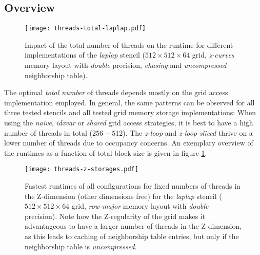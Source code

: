 \subsection{Overview}

\begin{figure}
	\begin{center}
    \texttt{[image: threads-total-laplap.pdf]}
	\end{center}
    \caption{\label{fig:blocksizes-overview} Impact of the total number of threads on the runtime for different implementations of the \emph{laplap} stencil ($512\times 512\times 64$ grid, \emph{z-curves} memory layout with \emph{double} precision, \emph{chasing} and \emph{uncompressed} neighborship table). }%
\end{figure}

The optimal \emph{total number} of threads depends mostly on the grid access implementation employed. In general, the same patterns can be observed for all three tested stencils and all tested grid memory storage implementations: When using the \emph{naive}, \emph{idxvar} or \emph{shared} grid access strategies, it is best to have a high number of threads in total ($256-512$). The \emph{z-loop} and \emph{z-loop-sliced} thrive on a lower number of threads due to occupancy concerns. An exemplary overview of the runtimes as a function of total block size is given in figure \ref{fig:blocksizes-overview}.

\begin{figure}
	\begin{center}
    \texttt{[image: threads-z-storages.pdf]}
	\end{center}
    \caption{\label{fig:blocksizes-z}Fastest runtimes of all configurations for fixed numbers of threads in the Z-dimension (other dimensions free) for the \emph{laplap} stencil ($512\times 512\times 64$ grid, \emph{row-major} memory layout with \emph{double} precision). Note how the Z-regularity of the grid makes it advantageous to have a larger number of threads in the Z-dimension, as this leads to caching of neighborship table entries, but only if the neighborship table is \emph{uncompressed}.}
\end{figure}

